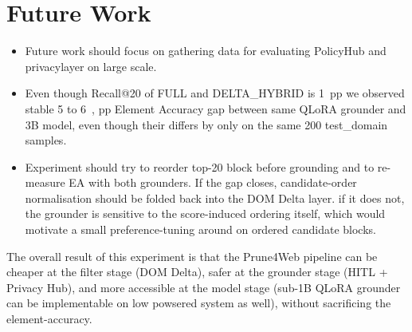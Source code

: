 \section{Future Work}
\begin{itemize}
    \item Future work should focus on gathering data for evaluating PolicyHub and privacylayer on large scale.
    \item Even though Recall@20 of FULL and DELTA\_HYBRID is 1~pp we observed stable 5 to 6~, pp Element Accuracy gap between same QLoRA grounder and 3B model, even though their differs by only on the same 200 test\_domain samples. 
    \item Experiment should try to reorder top-20 block before grounding and to re-measure EA with both grounders. If the gap closes, candidate-order normalisation should be folded back into the DOM Delta layer. if it does not, the grounder is sensitive to the score-induced ordering itself, which would motivate a small preference-tuning around on ordered candidate blocks.
\end{itemize}

The overall result of this experiment is that the Prune4Web pipeline can be cheaper at the filter stage (DOM Delta), safer at the grounder stage (HITL + Privacy Hub), and more accessible at the model stage (sub-1B QLoRA grounder can be implementable on low powsered system as well), without sacrificing the element-accuracy.

